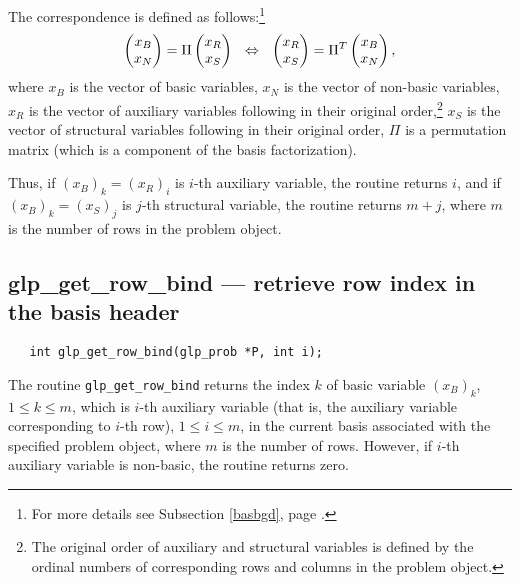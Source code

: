 The correspondence is defined as follows:\footnote{For more details see
Subsection \ref{basbgd}, page \pageref{basbgd}.}
$$\left(\begin{array}{@{}c@{}}x_B\\x_N\\\end{array}\right)=
\Pi\left(\begin{array}{@{}c@{}}x_R\\x_S\\\end{array}\right)
\ \ \Leftrightarrow
\ \ \left(\begin{array}{@{}c@{}}x_R\\x_S\\\end{array}\right)=
\Pi^T\left(\begin{array}{@{}c@{}}x_B\\x_N\\\end{array}\right),$$
where $x_B$ is the vector of basic variables, $x_N$ is the vector of
non-basic variables, $x_R$ is the vector of auxiliary variables
following in their original order,\footnote{The original order of
auxiliary and structural variables is defined by the ordinal numbers
of corresponding rows and columns in the problem object.} $x_S$ is the
vector of structural variables following in their original order, $\Pi$
is a permutation matrix (which is a component of the basis
factorization).

Thus, if $(x_B)_k=(x_R)_i$ is $i$-th auxiliary variable, the routine
returns $i$, and if $(x_B)_k=(x_S)_j$ is $j$-th structural variable,
the routine returns $m+j$, where $m$ is the number of rows in the
problem object.

\subsection{glp\_get\_row\_bind --- retrieve row index in the basis
header}

\synopsis

\begin{verbatim}
   int glp_get_row_bind(glp_prob *P, int i);
\end{verbatim}

\returns

The routine \verb|glp_get_row_bind| returns the index $k$ of basic
variable $(x_B)_k$, $1\leq k\leq m$, which is $i$-th auxiliary variable
(that is, the auxiliary variable corresponding to $i$-th row),
$1\leq i\leq m$, in the current basis associated with the specified
problem object, where $m$ is the number of rows. However, if $i$-th
auxiliary variable is non-basic, the routine returns zero.


